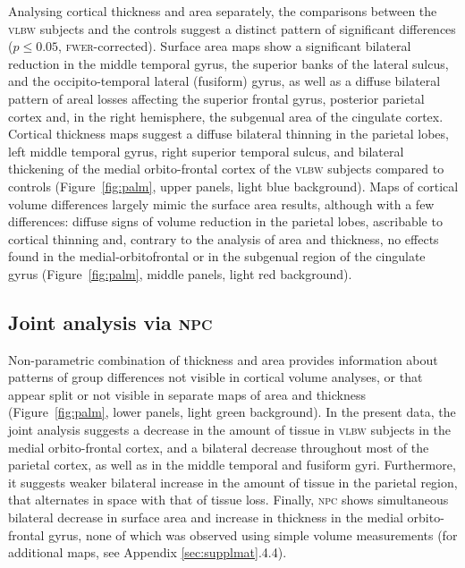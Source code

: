 Analysing cortical thickness and area separately, the comparisons between the \textsc{vlbw} subjects and the controls suggest a distinct pattern of significant differences ($p \leqslant 0.05$, \textsc{fwer}-corrected). Surface area maps show a significant bilateral reduction in the middle temporal gyrus, the superior banks of the lateral sulcus, and the occipito-temporal lateral (fusiform) gyrus, as well as a diffuse bilateral pattern of areal losses affecting the superior frontal gyrus, posterior parietal cortex and, in the right hemisphere, the subgenual area of the cingulate cortex. Cortical thickness maps suggest a diffuse bilateral thinning in the parietal lobes, left middle temporal gyrus, right superior temporal sulcus, and bilateral thickening of the medial orbito-frontal cortex of the \textsc{vlbw} subjects compared to controls (Figure~\ref{fig:palm}, upper panels, light blue background). Maps of cortical volume differences largely mimic the surface area results, although with a few differences: diffuse signs of volume reduction in the parietal lobes, ascribable to cortical thinning and, contrary to the analysis of area and thickness, no effects found in the medial-orbitofrontal or in the subgenual region of the cingulate gyrus (Figure~\ref{fig:palm}, middle panels, light red background).

\subsection{Joint analysis via \textsc{npc}}

Non-parametric combination of thickness and area provides information about patterns of group differences not visible in cortical volume analyses, or that appear split or not visible in separate maps of area and thickness (Figure~\ref{fig:palm}, lower panels, light green background). In the present data, the joint analysis suggests a decrease in the amount of tissue in \textsc{vlbw} subjects in the medial orbito-frontal cortex, and a bilateral decrease throughout most of the parietal cortex, as well as in the middle temporal and fusiform gyri. Furthermore, it suggests weaker bilateral increase in the amount of tissue in the parietal region, that alternates in space with that of tissue loss. Finally, \textsc{npc} shows simultaneous bilateral decrease in surface area and increase in thickness in the medial orbito-frontal gyrus, none of which was observed using simple volume measurements (for additional maps, see Appendix \ref{sec:supplmat}.4.4).

